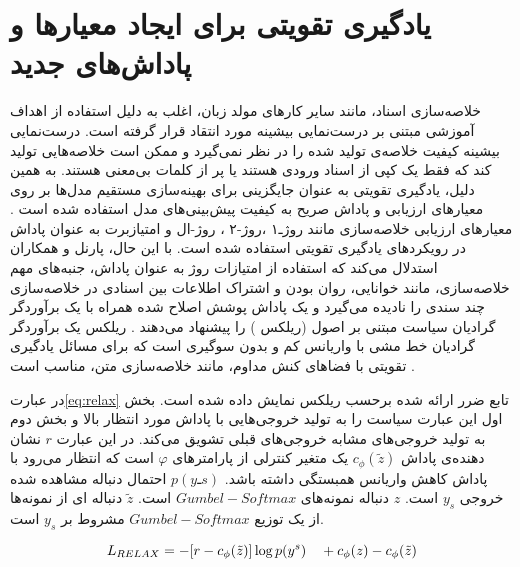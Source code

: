 \section{یادگیری تقویتی  برای ایجاد معیارها و پاداش‌های جدید}
	
	خلاصه‌سازی اسناد، مانند سایر کارهای مولد زبان،  اغلب به دلیل استفاده از اهداف آموزشی مبتنی بر  درست‌نمایی بیشینه
	 مورد انتقاد قرار گرفته است.
	درست‌نمایی بیشینه کیفیت خلاصه‌ی تولید شده را در نظر نمی‌گیرد و ممکن است خلاصه‌هایی تولید کند که فقط یک کپی از اسناد ورودی هستند یا پر از کلمات بی‌معنی هستند. به همین دلیل، یادگیری تقویتی به عنوان جایگزینی برای بهینه‌سازی مستقیم مدل‌ها بر روی معیارهای ارزیابی و پاداش صریح به کیفیت پیش‌بینی‌های مدل استفاده شده است
	\cite{Parnell2022AMC}. 
	معیارهای ارزیابی خلاصه‌سازی مانند روژـ۱
،روژ-۲
،
روژ-‌ال
	و امتیازبرت
	 به عنوان پاداش در رویکردهای یادگیری تقویتی استفاده شده است. با این حال، پارنل و همکاران  استدلال می‌کند که استفاده از امتیازات روژ به عنوان پاداش، جنبه‌های مهم خلاصه‌سازی، مانند خوانایی، روان بودن و اشتراک اطلاعات بین اسنادی در خلاصه‌سازی چند سندی را نادیده می‌گیرد و یک پاداش پوشش اصلاح شده همراه با یک برآوردگر گرادیان سیاست مبتنی بر اصول (ریلکس )
	  را پیشنهاد می‌دهند
	  \cite{Parnell2022AMC, ALOMARI}.
	   ریلکس یک برآوردگر گرادیان خط مشی
	  با واریانس کم و بدون سوگیری
	     است که برای مسائل یادگیری تقویتی با فضاهای کنش مداوم، مانند خلاصه‌سازی متن، مناسب است
	     \cite{Grathwohl2017BackpropagationTT}.
	     
	   در عبارت\ref {eq:relax} تابع ضرر ارائه شده برحسب ریلکس نمایش داده شده است.
	  بخش اول این عبارت سیاست را به تولید خروجی‌هایی با پاداش مورد انتظار بالا و بخش دوم به تولید خروجی‌‌های مشابه خروجی‌های قبلی 
	  تشویق می‌کند.
  در این عبارت
	  $ r $
	  نشان دهنده‌ی پاداش 
	 $  c_\phi(\tilde{z}) $
	 یک متغیر کنترلی از پارامترهای $ φ $ است که انتظار می‌رود با پاداش کاهش واریانس همبستگی داشته باشد.
	$  p(yـs) $ 
	احتمال دنباله مشاهده شده خروجی $ y_s $ است.
	 $ z $
	  دنباله نمونه‌های $Gumbel-Softmax  $ است.
	 $ \tilde{z} $
	  دنباله ای از نمونه‌ها از یک توزیع $ Gumbel-Softmax $ مشروط بر $ y_s $ است.
	

	  \begin{equation}
	  \label{eq:relax}
	  L_\text{$ RELAX $} = -[r - c_\phi(\tilde{z})]   \log p(y^{s}) \quad + c_\phi(z) - c_\phi(\tilde{z})
	  \end{equation}
	
